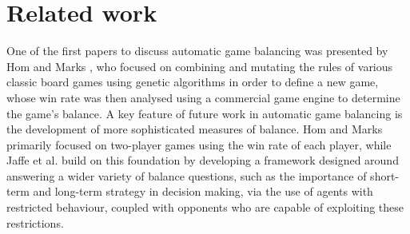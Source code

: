 

% 
% 

\section{Related work}


\label{back:related}

One of the first papers to discuss automatic game balancing was presented by Hom and Marks \cite{hom_automatic_2007}, who focused on combining and mutating the rules of various classic board games using genetic algorithms in order to define a new game, whose win rate was then analysed using a commercial game engine to determine the game's balance. A key feature of future work in automatic game balancing is the development of more sophisticated measures of balance. Hom and Marks primarily focused on two-player games using the win rate of each player, while Jaffe et al. \cite{jaffe_evaluating_2012} build on this foundation by developing a framework designed around answering a wider variety of balance questions, such as the importance of short-term and long-term strategy in decision making, via the use of agents with restricted behaviour, coupled with opponents who are capable of exploiting these restrictions.

